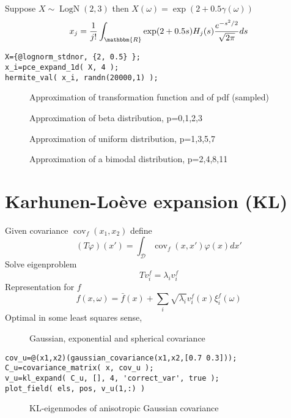 \documentclass{article}
\newcommand{\tmop}[1]{\ensuremath{\operatorname{#1}}}
\begin{document}
Suppose $X \sim \tmop{LogN} (2, 3)$ then $X (\omega) = \exp (2 + 0.5 \gamma
(\omega))$
\[ x_j = \frac{1}{j!} \int_{\mathbbm{R}} \exp (2 + 0.5 s) H_j (s) \frac{e^{-
   s^2 / 2}}{\sqrt{2 \pi}}  d s \]
\begin{verbatim}
X={@lognorm_stdnor, {2, 0.5} }; 
x_i=pce_expand_1d( X, 4 );
hermite_val( x_i, randn(20000,1) );
\end{verbatim}
\begin{figure}[h]
  \caption{Approximation of transformation function and of pdf (sampled)}
\end{figure}

{\newpage}

\begin{figure}[h]
  \caption{Approximation of beta distribution, p=0,1,2,3}
\end{figure}

{\newpage}

\begin{figure}[h]
  \caption{Approximation of uniform distribution, p=1,3,5,7}
\end{figure}

{\newpage}

\begin{figure}[h]
  \caption{Approximation of a bimodal distribution, p=2,4,8,11}
\end{figure}

{\newpage}

\section{Karhunen-Lo\`eve expansion (KL)}

Given covariance $\tmop{cov}_f (x_1, x_2)$ define
\[ (T \varphi) (x') = \int_{\mathcal{D}} \tmop{cov}_f (x, x') \varphi (x) d x'
\]
Solve eigenproblem
\[ T v^f_i = \lambda_i v^f_i \]
Representation for $f$
\[ f (x, \omega) = \bar{f} (x) + \sum_i \sqrt{\lambda_i} v_i^f (x) \xi_i^f
   (\omega) \]
Optimal in some least squares sense,

\begin{figure}[h]
  \caption{Gaussian, exponential and spherical covariance}
\end{figure}

{\newpage}


\begin{verbatim}
cov_u=@(x1,x2)(gaussian_covariance(x1,x2,[0.7 0.3])); 
C_u=covariance_matrix( x, cov_u );
v_u=kl_expand( C_u, [], 4, 'correct_var', true );
plot_field( els, pos, v_u(1,:) )
\end{verbatim}
\begin{figure}[h]
  \caption{KL-eigenmodes of anisotropic Gaussian covariance}
\end{figure}
\end{document}
